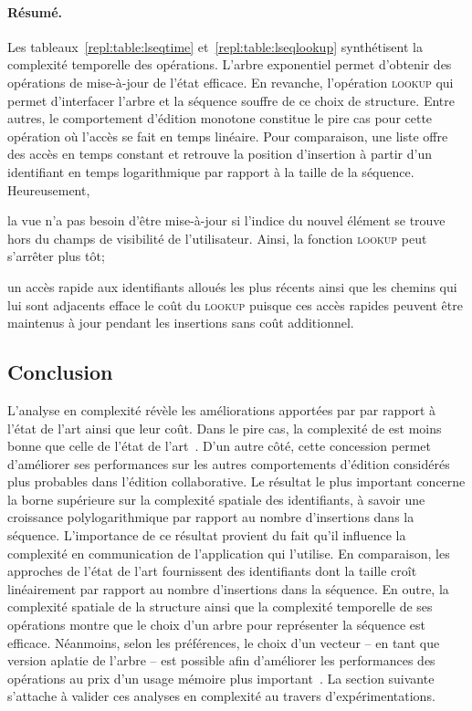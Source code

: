 \paragraph{Résumé.} Les tableaux~\ref{repl:table:lseqtime}
et~\ref{repl:table:lseqlookup} synthétisent la complexité temporelle des
opérations. L'arbre exponentiel permet d'obtenir des opérations de mise-à-jour
de l'état efficace. En revanche, l'opération \textsc{lookup} qui permet
d'interfacer l'arbre et la séquence souffre de ce choix de structure.  Entre
autres, le comportement d'édition monotone constitue le pire cas pour cette
opération où l'accès se fait en temps linéaire. Pour comparaison, une liste
offre des accès en temps constant et retrouve la position d'insertion à partir
d'un identifiant en temps logarithmique par rapport à la taille de la
séquence. Heureusement,
\begin{inparaenum}[(i)]
\item la vue n'a pas besoin d'être mise-à-jour si l'indice du nouvel élément se
  trouve hors du champs de visibilité de l'utilisateur. Ainsi, la fonction
  \textsc{lookup} peut s'arrêter plus tôt;
\item un accès rapide aux identifiants alloués les plus récents ainsi que les
  chemins qui lui sont adjacents efface le coût du \textsc{lookup} puisque ces
  accès rapides peuvent être maintenus à jour pendant les insertions sans coût
  additionnel.
\end{inparaenum}

\subsection{Conclusion}

L'analyse en complexité révèle les améliorations apportées par \LSEQ par rapport
à l'état de l'art ainsi que leur coût. Dans le pire cas, la complexité de \LSEQ
est moins bonne que celle de l'état de l'art~\cite{preguica2009commutative,
  weiss2009logoot}.  D'un autre côté, cette concession permet d'améliorer ses
performances sur les autres comportements d'édition considérés plus probables
dans l'édition collaborative. Le résultat le plus important concerne la borne
supérieure sur la complexité spatiale des identifiants, à savoir une croissance
polylogarithmique par rapport au nombre d'insertions dans la séquence. L'importance
de ce résultat provient du fait qu'il influence la complexité en communication
de l'application qui l'utilise. En comparaison, les approches de l'état de
l'art fournissent des identifiants dont la taille croît linéairement par rapport
au nombre d'insertions dans la séquence.  En outre, la complexité spatiale de la
structure ainsi que la complexité temporelle de ses opérations montre que le
choix d'un arbre pour représenter la séquence est efficace. Néanmoins, selon les
préférences, le choix d'un vecteur -- en tant que version aplatie de l'arbre --
est possible afin d'améliorer les performances des opérations au prix d'un usage
mémoire plus important~\cite{weiss2009logoot}. La section suivante s'attache à
valider ces analyses en complexité au travers d'expérimentations.


